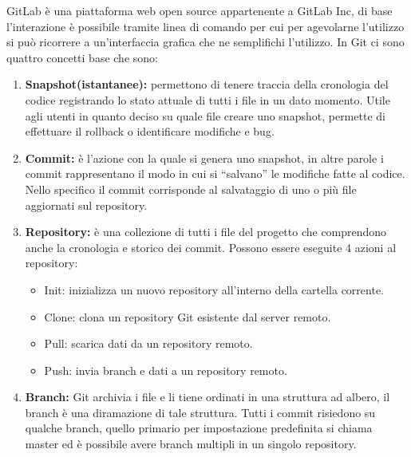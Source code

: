 GitLab è una piattaforma web open source appartenente a GitLab Inc, di base l'interazione è possibile tramite linea di comando per cui per agevolarne l'utilizzo si 
può ricorrere a un’interfaccia grafica che ne semplifichi l’utilizzo.
In Git ci sono quattro concetti base che sono:
\begin{enumerate}
    \item \textbf{Snapshot(istantanee):} permettono di tenere traccia della cronologia del codice registrando lo stato attuale di tutti i file in un dato momento. 
    Utile agli utenti in quanto deciso su quale file creare uno snapshot, permette di effettuare il rollback o identificare modifiche e bug.
    \item \textbf{Commit:} è l’azione con la quale si genera uno snapshot, in altre parole i commit rappresentano il modo in cui si ``salvano” le modifiche fatte al 
    codice. Nello specifico il commit corrisponde al salvataggio di uno o più file aggiornati sul repository.
    \item \textbf{Repository:} è una collezione di tutti i file del progetto che comprendono anche la cronologia e storico dei commit. Possono essere eseguite 4 azioni al 
    repository:
    \begin{itemize}
        \item Init: inizializza un nuovo repository all’interno della cartella corrente.
        \item Clone: clona un repository Git esistente dal server remoto.
        \item Pull: scarica dati da un repository remoto.
        \item Push: invia branch e dati a un repository remoto.
    \end{itemize}
    \item \textbf{Branch:} Git archivia i file e li tiene ordinati in una struttura ad albero, il branch è una diramazione di tale struttura. Tutti i commit risiedono 
    su qualche branch, quello primario per impostazione predefinita si chiama master ed è possibile avere branch multipli in un singolo repository.
\end{enumerate}